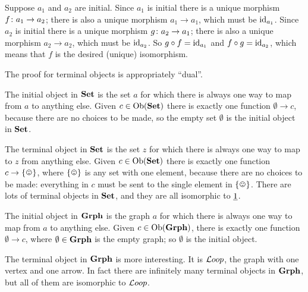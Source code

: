 \documentclass[CT4S-EN-RU]{subfiles}
\begin{document}
\begin{propositionRUS}\label{prop:initials are isomorphic}
\end{propositionRUS}

\begin{proofENG}
Suppose $a_1$ and $a_2$ are initial. Since $a_1$ is initial there is a unique morphism $f\colon a_1\rightarrow a_2$; there is also a unique morphism $a_1\to a_1$, which must be $\textnormal{id}_{a_1}$. Since $a_2$ is initial there is a unique morphism $g\colon a_2\rightarrow a_1$; there is also a unique morphism $a_2\to a_2$, which must be $\textnormal{id}_{a_2}$. So $g\circ f=\textnormal{id}_{a_1}$ and $f\circ g=\textnormal{id}_{a_2}$, which means that $f$ is the desired (unique) isomorphism.

The proof for terminal objects is appropriately “dual”.
\end{proofENG}

\begin{proofRUS}
\end{proofRUS}

\begin{exampleENG}\label{ex:universal obs in set}
The initial object in ${\bf Set}$ is the set $a$ for which there is always one way to map from $a$ to anything else. Given $c\in\textnormal{Ob}({\bf Set})$ there is exactly one function $\emptyset\to c$, because there are no choices to be made, so the empty set $\emptyset$ is the initial object in ${\bf Set}$.

The terminal object in ${\bf Set}$ is the set $z$ for which there is always one way to map to $z$ from anything else. Given $c\in\textnormal{Ob}({\bf Set})$ there is exactly one function $c\to\singleton$, where $\singleton$ is any set with one element, because there are no choices to be made: everything in $c$ must be sent to the single element in $\singleton$. There are lots of terminal objects in ${\bf Set}$, and they are all isomorphic to $\underline{1}$.
\end{exampleENG}

\begin{exampleRUS}\label{ex:universal obs in set}
\end{exampleRUS}

\begin{exampleENG}
The initial object in ${\bf Grph}$ is the graph $a$ for which there is always one way to map from $a$ to anything else. Given $c\in\textnormal{Ob}({\bf Grph})$, there is exactly one function $\emptyset\to c$, where $\emptyset\in{\bf Grph}$ is the empty graph; so $\emptyset$ is the initial object.

The terminal object in ${\bf Grph}$ is more interesting. It is ${\mathcal{L} oop}$, the graph with one vertex and one arrow. In fact there are infinitely many terminal objects in ${\bf Grph}$, but all of them are isomorphic to ${\mathcal{L} oop}$. 
\end{exampleENG}
\end{document}
